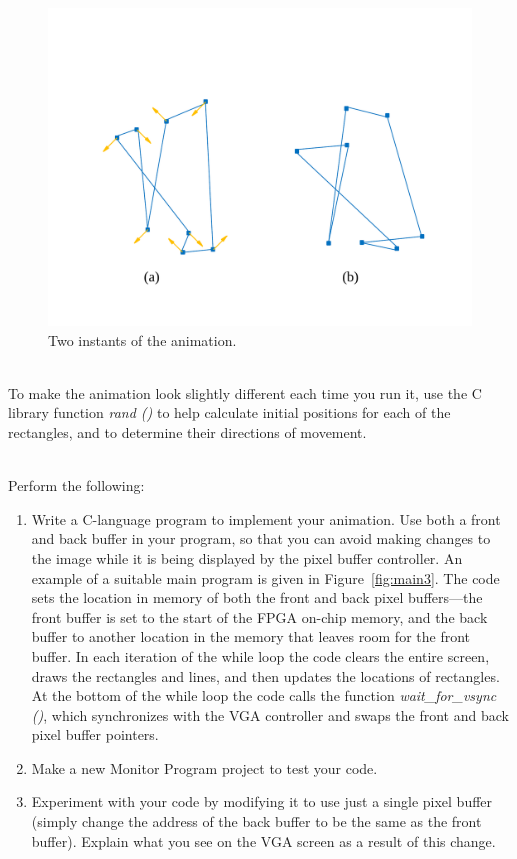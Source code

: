 \documentclass[epsfig,10pt,fullpage]{article}
\begin{document}
\begin{figure}[h!]
   \begin{center}
       \includegraphics[scale = 0.5]{figures/fig_animation_example.pdf}
   \end{center}
   \caption{Two instants of the animation.}
	\label{fig:animation_example}
\end{figure}

~\\
\noindent
To make the animation look slightly different each time you run it, use the C library function 
{\it rand ()} to help calculate initial positions for each of the rectangles, and to determine 
their directions of movement. 

~\\
\noindent
Perform the following:

\begin{enumerate}

\item Write a C-language program to implement your animation. Use both a front and back buffer 
in your program, so that you can avoid making changes to the image while it is being displayed 
by the pixel buffer controller.  An example of a suitable main program is given in 
Figure~\ref{fig:main3}. The code sets the location in memory of both the front and back pixel 
buffers---the front buffer is set to the start of the FPGA on-chip memory, and the back
buffer to another location in the memory that leaves room for the front buffer.
In each iteration of the while loop the code clears the entire screen, 
draws the rectangles and lines, and then 
updates the locations of rectangles. At the bottom of the while loop the code calls the
function {\it wait\_for\_vsync ()}, which synchronizes with the VGA controller and swaps the 
front and back pixel buffer pointers.

\item Make a new Monitor Program project to test your code.

\item Experiment with your code by modifying it to use just a single pixel buffer (simply
change the address of the back buffer to be the same as the front buffer). Explain what you 
see on the VGA screen as a result of this change.
\end{enumerate}
\end{document}
